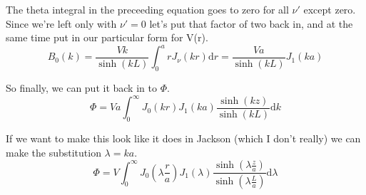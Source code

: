 \documentclass[10pt,a4paper]{article}
\begin{document}
The theta integral in the preceeding equation goes to zero for all $\nu'$ except zero.  Since we're left only with $\nu'=0$ let's put that factor of two back in, and at the same time put in our particular form for V(r).
\begin{equation}
B_0(k)=\frac{Vk}{\sinh(kL)}\int_0^a r J_{\nu}(kr)\mathrm{d}r
=\frac{Va}{\sinh(kL)}J_1(ka)
\end{equation}

So finally, we can put it back in to $\Phi$.
\begin{equation}\boxed{
\Phi=Va\int_0^\infty J_0(kr)J_1(ka)\frac{\sinh(kz)}{\sinh(kL)}\mathrm{d}k
}\end{equation}

If we want to make this look like it does in Jackson (which I don't really) we can make the substitution $\lambda=ka$.
\begin{equation}
\Phi=V\int_0^\infty J_0(\lambda \frac{r}{a})J_1(\lambda)\frac{\sinh(\lambda \frac{z}{a})}{\sinh(\lambda \frac{L	}{a})}\mathrm{d}\lambda
\end{equation}
\end{document}
